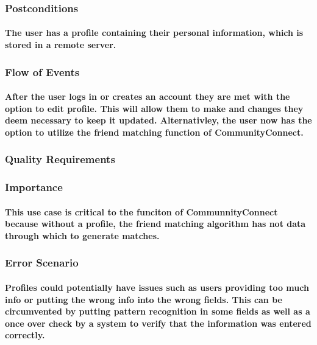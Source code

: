\documentclass[12pt]{article}
\begin{document}
		\subsubsection{Postconditions}
			\paragraph{\normalfont The user has a profile containing their personal information, which is stored in a remote server.
			}
		\subsubsection{Flow of Events}
			\paragraph{\normalfont After the user logs in or creates an account they are met with the option to edit profile. This will allow them to make and changes they deem necessary to keep it updated. Alternativley, the user now has the option to utilize the friend matching function of CommunityConnect.
			}
		\subsubsection{Quality Requirements}
			\paragraph{\normalfont
			}
		\subsubsection{Importance}
			\paragraph{\normalfont This use case is critical to the funciton of CommunnityConnect because without a profile, the friend matching algorithm has not data through which to generate matches.
			}
		\subsubsection{Error Scenario}
			\paragraph{\normalfont Profiles could potentially have issues such as users providing too much info or putting the wrong info into the wrong fields. This can be circumvented by putting pattern recognition in some fields as well as a once over check by a system to verify that the information was entered correctly.
			}
\end{document}
